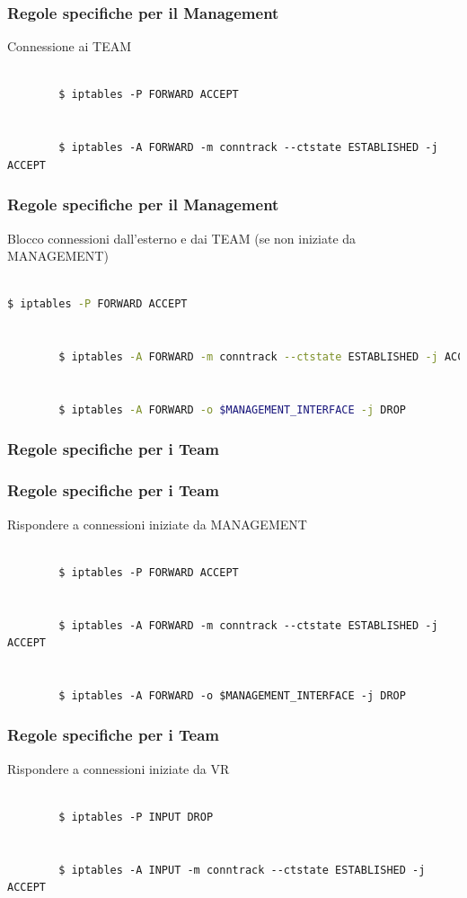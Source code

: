 \documentclass{beamer}
\begin{document}
\begin{frame}[fragile]
    \frametitle{Regole specifiche per il Management}
    Connessione ai TEAM
    \\~\\
    \begin{lstlisting}
        $ iptables -P FORWARD ACCEPT
        
        
        $ iptables -A FORWARD -m conntrack --ctstate ESTABLISHED -j ACCEPT
    \end{lstlisting}
\end{frame}

\begin{frame}[fragile]
    \frametitle{Regole specifiche per il Management}
    Blocco connessioni dall'esterno e dai TEAM (se non iniziate da MANAGEMENT)
    \\~\\
    \begin{lstlisting}[language=sh]
        $ iptables -P FORWARD ACCEPT 
        
        
        $ iptables -A FORWARD -m conntrack --ctstate ESTABLISHED -j ACCEPT
        
        
        $ iptables -A FORWARD -o $MANAGEMENT_INTERFACE -j DROP        
    \end{lstlisting}
\end{frame}

\subsubsection{Regole specifiche per i Team}
\begin{frame}[fragile]
    \frametitle{Regole specifiche per i Team}
    Rispondere a connessioni iniziate da MANAGEMENT
    \\~\\
    \begin{lstlisting}
        $ iptables -P FORWARD ACCEPT 
        
        
        $ iptables -A FORWARD -m conntrack --ctstate ESTABLISHED -j ACCEPT
        
        
        $ iptables -A FORWARD -o $MANAGEMENT_INTERFACE -j DROP
    \end{lstlisting}

\end{frame}
\begin{frame}[fragile]
    \frametitle{Regole specifiche per i Team}
    Rispondere a connessioni iniziate da VR
    \\~\\
    \begin{lstlisting}
        $ iptables -P INPUT DROP
        
        
        $ iptables -A INPUT -m conntrack --ctstate ESTABLISHED -j ACCEPT
    \end{lstlisting}

\end{frame}
\end{document}
